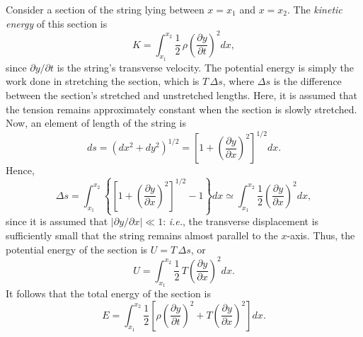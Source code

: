 Consider a section of the string lying between $x=x_1$ and $x=x_2$. The
{\em kinetic energy}\/ of this section is 
\begin{equation}
K = \int_{x_1}^{x_2}\frac{1}{2}\,\rho\left(\frac{\partial y}{\partial t}\right)^2 dx,
\end{equation}
since $\partial y/\partial t$ is the string's transverse velocity. The potential energy
is simply the work done in stretching the section, which is $T\,\Delta s$, where
$\Delta s$ is the difference between the section's stretched and unstretched lengths.
Here, it is assumed that the tension remains approximately constant when the
section is slowly stretched. Now, an element of length of the string is
\begin{equation}
ds = (dx^2+dy^2)^{1/2} = \left[1+ \left(\frac{\partial y}{\partial x}\right)^2\right]^{1/2} dx.
\end{equation}
Hence,
\begin{equation}
\Delta s = \int_{x_1}^{x_2}  \left\{\left[1+ \left(\frac{\partial y}{\partial x}\right)^2\right]^{1/2}-1\right\} dx\simeq \int_{x_1}^{x_2}\frac{1}{2}\left(\frac{\partial y}{\partial x}\right)^2 dx,
\end{equation}
since it is assumed that $|\partial y/\partial x|\ll 1$: {\em i.e.},  the transverse displacement is sufficiently small that  the string remains
almost parallel to the $x$-axis. Thus, the potential energy of the section is
$U=T\,\Delta s$, or
\begin{equation}
U = \int_{x_1}^{x_2}\frac{1}{2}\,T\left(\frac{\partial y}{\partial x}\right)^2 dx.
\end{equation}
It follows that the total energy of the section is
\begin{equation}\label{e7.27}
E = \int_{x_1}^{x_2}\frac{1}{2}\left[\rho\left(\frac{\partial y}{\partial t}\right)^2
+ T\left(\frac{\partial y}{\partial x}\right)^2\right] dx.
\end{equation}


